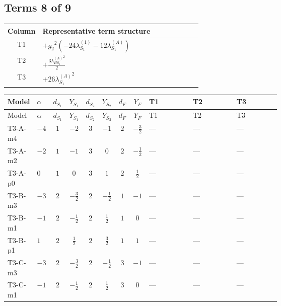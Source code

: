 \documentclass[8pt]{article}
\begin{document}
\begin{landscape}
\subsection*{Terms 8 of 9}
\begin{center}
\begin{tabular}{@{}c >{\raggedright\arraybackslash}p{0.82\linewidth}@{}}
\toprule
Column & Representative term structure \\
\midrule
T1 & \(\displaystyle +{g_2}^2 (-24 {\lambda_{S_1}^{(1)}}-12 {\lambda_{S_1}^{(A)}})\) \\
\midrule
T2 & \(\displaystyle +\frac{3 {\lambda_{HS_1}^{(A)}}^2}{2}\) \\
\midrule
T3 & \(\displaystyle +26 {\lambda_{S_1}^{(A)}}^2\) \\
\midrule
\bottomrule
\end{tabular}
\end{center}
\smallskip
\tiny
\begin{longtable}{@{}llcccccc >{\raggedright\arraybackslash}p{0.21\linewidth} >{\raggedright\arraybackslash}p{0.21\linewidth} >{\raggedright\arraybackslash}p{0.21\linewidth}@{}}
\toprule
Model & $\alpha$ & $d_{S_1}$ & $Y_{S_1}$ & $d_{S_2}$ & $Y_{S_2}$ & $d_F$ & $Y_F$ & T1 & T2 & T3 \\
\midrule
\endfirsthead
\toprule
Model & $\alpha$ & $d_{S_1}$ & $Y_{S_1}$ & $d_{S_2}$ & $Y_{S_2}$ & $d_F$ & $Y_F$ & T1 & T2 & T3 \\
\midrule
\endhead
T3-A-m4 & $-4$ & $1$ & $-2$ & $3$ & $-1$ & $2$ & $-\frac{3}{2}$ & --- & --- & --- \\
\midrule
T3-A-m2 & $-2$ & $1$ & $-1$ & $3$ & $0$ & $2$ & $-\frac{1}{2}$ & --- & --- & --- \\
\midrule
T3-A-p0 & $0$ & $1$ & $0$ & $3$ & $1$ & $2$ & $\frac{1}{2}$ & --- & --- & --- \\
\midrule
T3-B-m3 & $-3$ & $2$ & $-\frac{3}{2}$ & $2$ & $-\frac{1}{2}$ & $1$ & $-1$ & --- & --- & --- \\
\midrule
T3-B-m1 & $-1$ & $2$ & $-\frac{1}{2}$ & $2$ & $\frac{1}{2}$ & $1$ & $0$ & --- & --- & --- \\
\midrule
T3-B-p1 & $1$ & $2$ & $\frac{1}{2}$ & $2$ & $\frac{3}{2}$ & $1$ & $1$ & --- & --- & --- \\
\midrule
T3-C-m3 & $-3$ & $2$ & $-\frac{3}{2}$ & $2$ & $-\frac{1}{2}$ & $3$ & $-1$ & --- & --- & --- \\
\midrule
T3-C-m1 & $-1$ & $2$ & $-\frac{1}{2}$ & $2$ & $\frac{1}{2}$ & $3$ & $0$ & --- & --- & --- \\
\midrule

\end{longtable}
\end{landscape}
\end{document}
